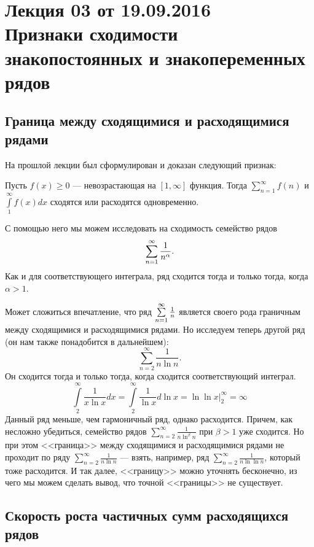 \documentclass[a4paper, 12pt]{article}
\begin{document}
\pagestyle{fancy}
\section{Лекция 03 от 19.09.2016 \\Признаки сходимости знакопостоянных и знакопеременных рядов}

\subsection{Граница между сходящимися и расходящимися рядами}

На прошлой лекции был сформулирован и доказан следующий признак:
\begin{Test}

Пусть $f(x) \geqslant 0$ --- невозрастающая на $[1, \infty]$ функция. Тогда $\sum\limits_{n=1}^{\infty}f(n)$ и $\int\limits_1^{\infty}f(x)dx$ сходятся или расходятся одновременно.
\end{Test}

С помощью него мы можем исследовать на сходимость семейство рядов
$$
\sum\limits_{n=1}^{\infty} \frac{1}{n^\alpha}.
$$
Как и для соответствующего интеграла, ряд сходится тогда и только тогда, когда $\alpha > 1$.

Может сложиться впечатление, что ряд $\sum\limits_{n=1}^{\infty} \frac{1}{n}$ является своего рода граничным между сходящимися и расходящимися рядами. Но исследуем теперь другой ряд (он нам также понадобится в дальнейшем):
$$
\sum\limits_{n=2}^{\infty} \frac{1}{n\ln n}.
$$
Он сходится тогда и только тогда, когда сходится соответствующий интеграл.
$$
\int\limits_{2}^{\infty} \frac{1}{x\ln x}dx = \int\limits_{2}^{\infty} \frac{1}{\ln x} d\ln x = \ln\ln x \Big|_2^{\infty} = \infty
$$
Данный ряд меньше, чем гармоничный ряд, однако расходится. Причем, как несложно убедиться, семейство рядов $\sum\limits_{n=2}^{\infty}\frac{1}{n\ln^\beta n}$ при $\beta > 1$ уже сходится. Но при этом <<граница>> между сходящимися и расходящимися рядами не проходит по ряду $\sum\limits_{n=2}^{\infty} \frac{1}{n\ln n}$ --- взять, например, ряд $\sum\limits_{n=2}^{\infty}\frac{1}{n\ln\ln n}$, который тоже расходится. И так далее, <<границу>> можно уточнять бесконечно, из чего мы можем сделать вывод, что точной <<границы>> не существует.

\subsection{Скорость роста частичных сумм расходящихся рядов}
\end{document}
